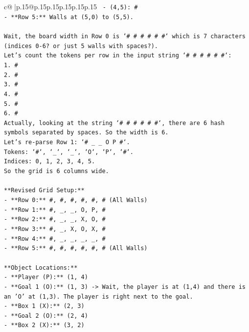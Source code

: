 \documentclass{article}
\begin{document}
{\begin{supertabular}{c@{$\;$}|p{.15\linewidth}@{}p{.15\linewidth}p{.15\linewidth}p{.15\linewidth}p{.15\linewidth}p{.15\linewidth}}
{{{\texttt{  {-} (4,5): \#} \\
\texttt{{-} **Row 5:** Walls at (5,0) to (5,5).} \\
\\ 
\texttt{Wait, the board width in Row 0 is `\# \# \# \# \# \#` which is 7 characters (indices 0{-}6? or just 5 walls with spaces?).} \\
\texttt{Let's count the tokens per row in the input string `\# \# \# \# \# \#`:} \\
\texttt{1. \#} \\
\texttt{2. \#} \\
\texttt{3. \#} \\
\texttt{4. \#} \\
\texttt{5. \#} \\
\texttt{6. \#} \\
\texttt{Actually, looking at the string `\# \# \# \# \# \#`, there are 6 hash symbols separated by spaces. So the width is 6.} \\
\texttt{Let's re{-}parse Row 1: `\# \_ \_ O P \#`.} \\
\texttt{Tokens: `\#`, `\_`, `\_`, `O`, `P`, `\#`.} \\
\texttt{Indices: 0, 1, 2, 3, 4, 5.} \\
\texttt{So the grid is 6 columns wide.} \\
\\ 
\texttt{**Revised Grid Setup:**} \\
\texttt{{-} **Row 0:** \#, \#, \#, \#, \#, \# (All Walls)} \\
\texttt{{-} **Row 1:** \#, \_, \_, O, P, \#} \\
\texttt{{-} **Row 2:** \#, \_, \_, X, O, \#} \\
\texttt{{-} **Row 3:** \#, \_, X, O, X, \#} \\
\texttt{{-} **Row 4:** \#, \_, \_, \_, \_, \#} \\
\texttt{{-} **Row 5:** \#, \#, \#, \#, \#, \# (All Walls)} \\
\\ 
\texttt{**Object Locations:**} \\
\texttt{{-} **Player (P):** (1, 4)} \\
\texttt{{-} **Goal 1 (O):** (1, 3) {-}> Wait, the player is at (1,4) and there is an 'O' at (1,3). The player is right next to the goal.} \\
\texttt{{-} **Box 1 (X):** (2, 3)} \\
\texttt{{-} **Goal 2 (O):** (2, 4)} \\
\texttt{{-} **Box 2 (X):** (3, 2)} \\
}}}
\end{supertabular}}
\end{document}
